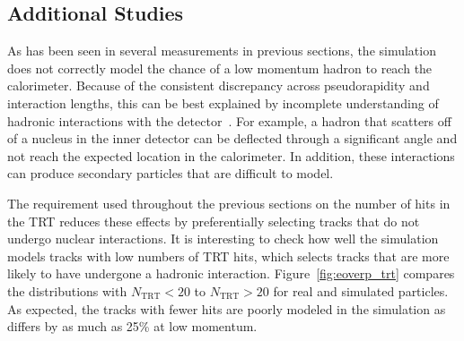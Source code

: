 \subsection{Additional Studies}
\label{sec:additional}

As has been seen in several measurements in previous sections, the simulation does not correctly model the chance of a low momentum hadron to reach the calorimeter.
Because of the consistent discrepancy across pseudorapidity and interaction lengths, this can be best explained by incomplete understanding of hadronic interactions with the detector~\cite{PERF-2015-05}.
For example, a hadron that scatters off of a nucleus in the inner detector can be deflected through a significant angle and not reach the expected location in the calorimeter.
In addition, these interactions can produce secondary particles that are difficult to model.

The requirement used throughout the previous sections  on the number of hits in the TRT reduces these effects by preferentially selecting tracks that do not undergo nuclear interactions.
It is interesting to check how well the simulation models tracks with low numbers of TRT hits, which selects tracks that are more likely to have undergone a hadronic interaction.
Figure~\ref{fig:eoverp_trt} compares the distributions with $N_{\mathrm{TRT}} < 20$ to $N_{\mathrm{TRT}} > 20$ for real and simulated particles.
As expected, the tracks with fewer hits are poorly modeled in the simulation as \epcor differs by as much as 25\% at low momentum.

